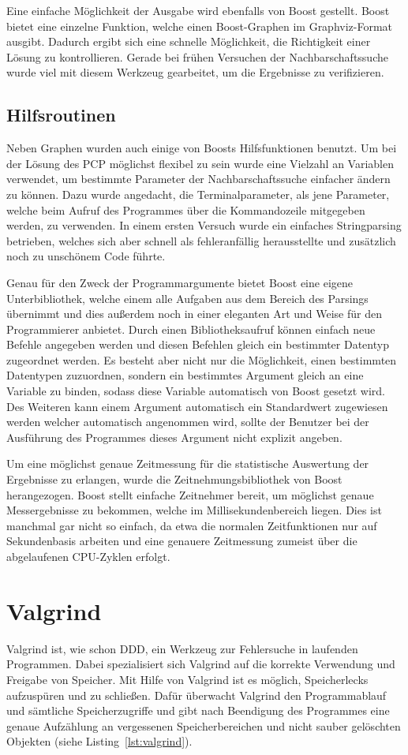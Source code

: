 Eine einfache Möglichkeit der Ausgabe wird ebenfalls von Boost gestellt. Boost bietet eine einzelne Funktion, welche einen Boost-Graphen im Graphviz-Format ausgibt. Dadurch ergibt sich eine schnelle 
Möglichkeit, die Richtigkeit einer Lösung zu kontrollieren. Gerade bei frühen Versuchen der Nachbarschaftssuche wurde viel mit diesem Werkzeug gearbeitet, um die Ergebnisse zu verifizieren. 

\subsection{Hilfsroutinen}
Neben Graphen wurden auch einige von Boosts Hilfsfunktionen benutzt. Um bei der Lösung des PCP möglichst flexibel zu sein wurde eine Vielzahl an Variablen verwendet, um bestimmte Parameter der 
Nachbarschaftssuche einfacher ändern zu können. Dazu wurde angedacht, die Terminalparameter, als jene Parameter, welche beim Aufruf des Programmes über die Kommandozeile mitgegeben werden, zu verwenden. 
In einem ersten Versuch wurde ein einfaches Stringparsing betrieben, welches sich aber schnell als fehleranfällig herausstellte und zusätzlich noch zu unschönem Code führte. 

Genau für den Zweck der Programmargumente bietet Boost eine eigene Unterbibliothek, welche einem alle Aufgaben aus dem Bereich des Parsings übernimmt und dies außerdem noch in ei\-ner eleganten Art und Weise für
den Programmierer anbietet. Durch einen Bibliotheksaufruf können einfach neue Befehle angegeben werden und diesen Befehlen gleich ein bestimmter Datentyp zugeordnet werden. Es besteht aber nicht nur die 
Möglichkeit, einen bestimmten Datentypen zuzuordnen, sondern ein bestimmtes Argument gleich an eine Variable zu binden, sodass diese Variable automatisch von Boost gesetzt wird. Des Weiteren kann einem
Argument automatisch ein Standardwert zugewiesen werden welcher automatisch angenommen wird, sollte der Benutzer bei der Ausführung des Programmes dieses Argument nicht explizit angeben. 

Um eine möglichst genaue Zeitmessung für die statistische Auswertung der Ergebnisse zu erlangen, wurde die Zeitnehmungsbibliothek von Boost herangezogen. Boost stellt einfache Zeitnehmer bereit, um 
möglichst genaue Messergebnisse zu bekommen, welche im Millisekundenbereich liegen. Dies ist manchmal gar nicht so einfach, da etwa die normalen Zeitfunktionen nur auf Sekundenbasis arbeiten und eine 
genauere Zeitmessung zumeist über die abgelaufenen CPU-Zyklen erfolgt.

\section{Valgrind}
Valgrind ist, wie schon DDD, ein Werkzeug zur Fehlersuche in laufenden Programmen. Dabei spezialisiert sich Valgrind auf die korrekte Verwendung und Freigabe von Speicher. Mit Hilfe von Valgrind ist es
möglich, Speicherlecks aufzuspüren und zu schließen. Dafür überwacht Valgrind den Programmablauf und sämtliche Speicherzugriffe und gibt nach Beendigung des Programmes eine genaue Aufzählung an vergessenen Speicherbereichen und 
nicht sauber gelöschten Objekten (siehe Listing~\ref{lst:valgrind}). 

